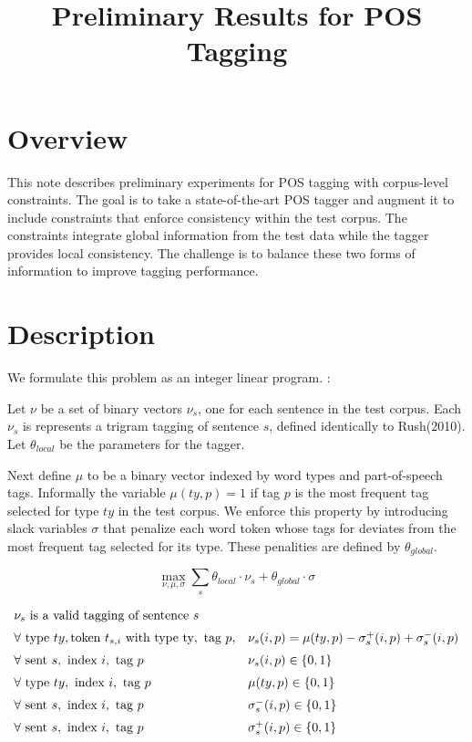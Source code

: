 \documentclass{article}
\title{Preliminary Results for POS Tagging}
\newcommand{\thetal}{\theta_{local}}
\newcommand{\thetag}{\theta_{global}}
\begin{document}
\maketitle{}
\section{Overview}

This note describes preliminary experiments for POS tagging with corpus-level constraints. The goal is to take a state-of-the-art POS tagger and augment it to include constraints that enforce consistency within the test corpus. The constraints integrate global information from the test data while the tagger provides local consistency. The challenge is to balance these two forms of information to improve tagging performance.


\section{Description}

We formulate this problem as an integer linear program. :


Let $\nu$ be a set of binary vectors $\nu_s$, one for each sentence in the test corpus. Each $\nu_s$ is represents a trigram tagging of sentence $s$, defined identically to Rush(2010). Let $\thetal$ be the parameters for the tagger.  

Next define $\mu$ to be a binary vector indexed by word types and part-of-speech tags. Informally the variable $\mu(ty,p) = 1$ if tag $p$ is the most frequent tag selected for type $ty$ in the test corpus. We enforce this property by introducing slack variables $\sigma$ that penalize each word token whose tags for deviates from the most frequent tag selected for its type. These penalities are defined by $\thetag$. 


$$ \max_{\nu, \mu, \sigma} \sum_s  \theta_{local} \cdot \nu_s + \theta_{global} \cdot \sigma $$

$
\begin{array}{lll}
  \nu_s \hbox{ is a valid tagging of sentence  $s$ } \\[0.2cm] 
  \forall \hbox{ type } ty,  \hbox{token } t_{s,i} \hbox{ with type ty}, \hbox{ tag } p,&  
   \nu_s(i, p) = \mu(ty, p)  - \sigma_s^+(i, p) + \sigma_s^-(i, p)
  \\[0.2cm]
\forall \hbox{ sent } s, \hbox{ index } i,  \hbox{ tag }p&  \nu_s(i, p)  \in \{0,1\}  \\[0.2cm]
\forall \hbox{ type } ty, \hbox{ index } i,  \hbox{ tag }p&  \mu(ty, p)  \in \{0,1\}  \\[0.2cm]
\forall \hbox{ sent } s, \hbox{ index } i, \hbox{ tag } p&  \sigma_s^-(i,p) \in \{0,1\}   \\[0.2cm]
\forall \hbox{ sent } s, \hbox{ index } i, \hbox{ tag } p&  \sigma_s^+(i,p) \in \{0,1\}   \\[0.2cm]


\end{array}
$
\end{document}
